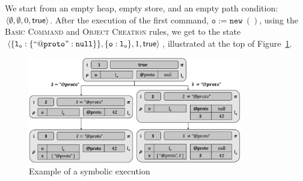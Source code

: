 We start from an empty heap, empty store, and an empty path condition: $\langle \emptyset, \emptyset, 0, {\sf true} \rangle$. After the execution of the first command, $\mathtt{o := new\ ()}$, using the \textsc{Basic Command} and \textsc{Object Creation} rules, we get to the state {\small $\langle \{ \mathtt{l_o : \{ ``@proto" : null} \} \}, \{ \mathtt{o : l_o} \} , 1, {\sf true} \rangle$}, illustrated at the top of Figure~\ref{fig:sexecexample}.

\begin{figure}[h!]
\centering
\includegraphics[width=0.83\textwidth]{symbSemEx.png}
\vspace*{-0.2cm}
\caption{Example of a \jilette symbolic execution}
\label{fig:sexecexample}
\vspace*{-0.5cm}
\end{figure}

